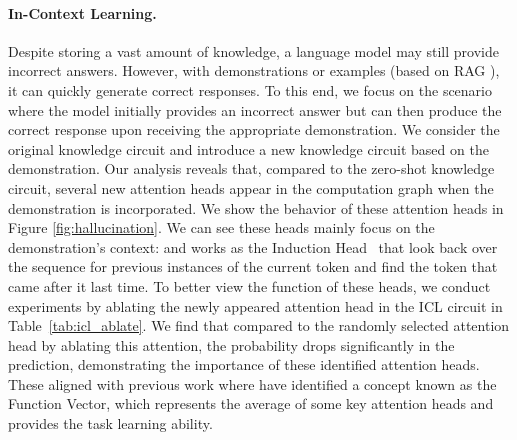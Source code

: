 \paragraph{In-Context Learning.}
Despite storing a vast amount of knowledge, a language model may still provide incorrect answers. 
However, with demonstrations or examples (based on RAG \cite{DBLP:journals/corr/abs-2312-10997}), it can quickly generate correct responses.
To this end, we focus on the scenario where the model initially provides an incorrect answer but can then produce the correct response upon receiving the appropriate demonstration. 
We consider the original knowledge circuit and introduce a new knowledge circuit based on the demonstration.
Our analysis reveals that, compared to the zero-shot knowledge circuit, several new attention heads appear in the computation graph when the demonstration is incorporated.
We show the behavior of these attention heads in Figure \ref{fig:hallucination}. 
We can see these heads mainly focus on the demonstration's context:  and works as the Induction Head~\cite{olsson2022context} that look back over the sequence for previous instances of the current token and find the token that came after it last time.
To better view the function of these heads, we conduct experiments by ablating the newly appeared attention head in the ICL circuit in Table~\ref{tab:icl_ablate}. 
We find that compared to the randomly selected attention head by ablating this attention, the probability drops significantly in the prediction, demonstrating the importance of these identified attention heads.
These aligned with previous work where \citet{todd2024llms} have identified a concept known as the Function Vector, which represents the average of some key attention heads and provides the task learning ability.
